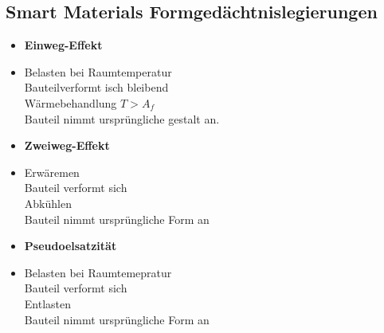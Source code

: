 \documentclass[12pt,twocolumn]{article}
\begin{document}
    \subsection{Smart Materials Formgedächtnislegierungen}
    \begin{minipage}[t]{0.32\columnwidth}
        \begin{itemize}[label={}, leftmargin=*, itemsep=0.01em]
            \item \textbf{Einweg-Effekt}
            \item Belasten bei Raumtemperatur \\ Bauteilverformt isch bleibend \\ Wärmebehandlung $T > A_f$ \\Bauteil nimmt ursprüngliche gestalt an.
        \end{itemize}
    \end{minipage}\hfill
    \begin{minipage}[t]{0.32\columnwidth}
        \begin{itemize}[label={}, leftmargin=*,  itemsep=0.01em]
            \item \textbf{Zweiweg-Effekt} 
            \item Erwäremen \\ Bauteil verformt sich \\ Abkühlen \\ Bauteil nimmt ursprüngliche Form an
        \end{itemize} 
    \end{minipage}\hfill
    \begin{minipage}[t]{0.32\columnwidth}
        \begin{itemize}[label={}, leftmargin=*,  itemsep=0.01em]
            \item \textbf{Pseudoelsatzität} 
            \item Belasten bei Raumtemepratur \\ Bauteil verformt sich \\ Entlasten \\ Bauteil nimmt ursprüngliche Form an
        \end{itemize} 
    \end{minipage}\hfill
\end{document}
